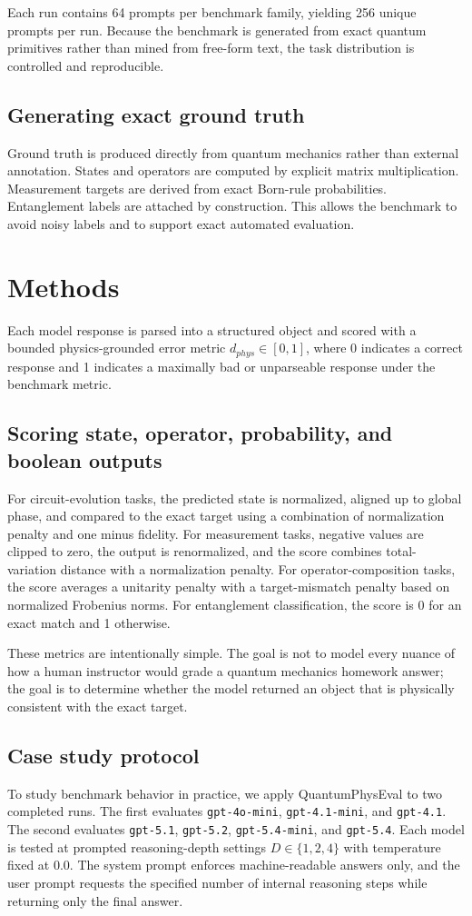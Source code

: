 \documentclass[11pt]{article}
\begin{document}
Each run contains 64 prompts per benchmark family, yielding 256 unique prompts per run. Because the benchmark is generated from exact quantum primitives rather than mined from free-form text, the task distribution is controlled and reproducible.

\subsection{Generating exact ground truth}
Ground truth is produced directly from quantum mechanics rather than external annotation. States and operators are computed by explicit matrix multiplication. Measurement targets are derived from exact Born-rule probabilities. Entanglement labels are attached by construction. This allows the benchmark to avoid noisy labels and to support exact automated evaluation.

\section{Methods}
Each model response is parsed into a structured object and scored with a bounded physics-grounded error metric $d_{phys}\in[0,1]$, where 0 indicates a correct response and 1 indicates a maximally bad or unparseable response under the benchmark metric.

\subsection{Scoring state, operator, probability, and boolean outputs}
For circuit-evolution tasks, the predicted state is normalized, aligned up to global phase, and compared to the exact target using a combination of normalization penalty and one minus fidelity. For measurement tasks, negative values are clipped to zero, the output is renormalized, and the score combines total-variation distance with a normalization penalty. For operator-composition tasks, the score averages a unitarity penalty with a target-mismatch penalty based on normalized Frobenius norms. For entanglement classification, the score is 0 for an exact match and 1 otherwise.

These metrics are intentionally simple. The goal is not to model every nuance of how a human instructor would grade a quantum mechanics homework answer; the goal is to determine whether the model returned an object that is physically consistent with the exact target.

\subsection{Case study protocol}
To study benchmark behavior in practice, we apply QuantumPhysEval to two completed runs. The first evaluates \texttt{gpt-4o-mini}, \texttt{gpt-4.1-mini}, and \texttt{gpt-4.1}. The second evaluates \texttt{gpt-5.1}, \texttt{gpt-5.2}, \texttt{gpt-5.4-mini}, and \texttt{gpt-5.4}. Each model is tested at prompted reasoning-depth settings $D\in\{1,2,4\}$ with temperature fixed at 0.0. The system prompt enforces machine-readable answers only, and the user prompt requests the specified number of internal reasoning steps while returning only the final answer.
\end{document}

